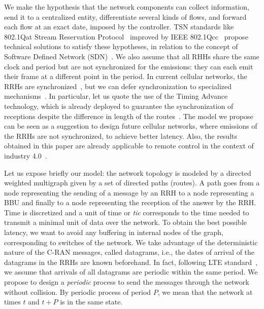 \documentclass[a4paper,10pt]{journal}
\begin{document}
 We make the hypothesis that the network components can collect information, send it to a centralized entity, differentiate several kinds of flows, and forward each flow at an exact date, imposed by the controller. TSN standards like 802.1Qat Stream Reservation Protocol~\cite{ieee802qat} improved by IEEE 802.1Qcc~\cite{6755436} propose technical solutions to satisfy these hypotheses, in relation to the concept of Software Defined Network (SDN)~\cite{mohamed2021software,li2015software,7356556}.
We also assume that all RHHs share the same clock and period but are not synchronized for the emissions: they can each emit their frame at a different point in the period.
In current cellular networks, the RRHs are synchronized~\cite{omri2019synchronization}, but we can defer synchronization to specialized mechanisms~\cite{khalili2016uplink,yemini2016multiple}. In particular, let us quote the use of the Timing Advance technology, which is already deployed to guarantee the synchronization of receptions despite the difference in length of the routes~\cite{mahmood2019time}.
The model we propose can be seen as a suggestion to design future cellular networks, where emissions of the RRHs are not synchronized, to achieve better latency. 
Also, the results obtained in this paper are already applicable to remote control in the context of industry 4.0~\cite{peng2021latency,garcia2019latency}.

Let us expose briefly our model: the network topology is modeled by a directed weighted multigraph given by a set of directed paths (routes). A path goes from a node representing the sending of a message by an RRH to a node representing a BBU and finally to a node representing the reception of the answer by the RRH. Time is discretized and a unit of time or \emph{tic} corresponds to the time needed to transmit a minimal unit of data over the network. To obtain the best possible latency, we want to avoid any buffering in internal nodes of the graph, corresponding to switches of the network. We take advantage of the deterministic nature of the C-RAN messages, called datagrams, i.e., the dates of arrival of the datagrams in the RRHs are known beforehand. In fact, following LTE standard~\cite{bouguen2012lte}, we assume that arrivals of all datagrams are periodic within the same period. We propose to design a \emph{periodic} process to send the messages through the network without collision. By periodic process of period $P$, we mean that the network at times $t$ and $t+P$ is in the same state. 
\end{document}
